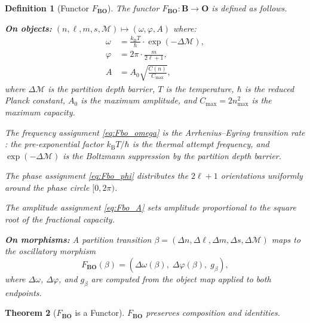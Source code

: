 \documentclass[twocolumn,10pt]{article}
\newtheorem{theorem}{Theorem}[section]
\newtheorem{definition}[theorem]{Definition}
\theoremstyle{remark}
\newcommand{\kB}{k_{\mathrm{B}}}
\newcommand{\Depth}{\mathcal{M}}
\newcommand{\CatO}{\mathbf{O}}
\newcommand{\CatB}{\mathbf{B}}
\newcommand{\Fbo}{F_{\CatB\CatO}}
\begin{document}
\begin{definition}[Functor $\Fbo$]
\label{def:Fbo}
The functor $\Fbo: \CatB \to \CatO$ is defined as follows.

\textbf{On objects:} $(n, \ell, m, s, \Depth) \mapsto (\omega, \varphi, A)$ where:
\begin{align}
\omega &= \frac{\kB T}{\hbar} \cdot \exp(-\Delta\Depth), \label{eq:Fbo_omega}\\
\varphi &= 2\pi \cdot \frac{m}{2\ell+1}, \label{eq:Fbo_phi}\\
A &= A_0 \sqrt{\frac{C(n)}{C_{\max}}}, \label{eq:Fbo_A}
\end{align}
where $\Delta\Depth$ is the partition depth barrier, $T$ is the temperature, $\hbar$ is the reduced Planck constant, $A_0$ is the maximum amplitude, and $C_{\max} = 2n_{\max}^2$ is the maximum capacity.

The frequency assignment \eqref{eq:Fbo_omega} is the Arrhenius--Eyring transition rate \cite{arrhenius1889,eyring1935}: the pre-exponential factor $\kB T/\hbar$ is the thermal attempt frequency, and $\exp(-\Delta\Depth)$ is the Boltzmann suppression by the partition depth barrier.

The phase assignment \eqref{eq:Fbo_phi} distributes the $2\ell+1$ orientations uniformly around the phase circle $[0,2\pi)$.

The amplitude assignment \eqref{eq:Fbo_A} sets amplitude proportional to the square root of the fractional capacity.

\textbf{On morphisms:} A partition transition $\beta = (\Delta n, \Delta\ell, \Delta m, \Delta s, \Delta\Depth)$ maps to the oscillatory morphism
\begin{equation}
\Fbo(\beta) = (\Delta\omega(\beta),\; \Delta\varphi(\beta),\; g_\beta),
\end{equation}
where $\Delta\omega$, $\Delta\varphi$, and $g_\beta$ are computed from the object map applied to both endpoints.
\end{definition}

\begin{theorem}[$\Fbo$ is a Functor]
\label{thm:Fbo_functor}
$\Fbo$ preserves composition and identities.
\end{theorem}
\end{document}
